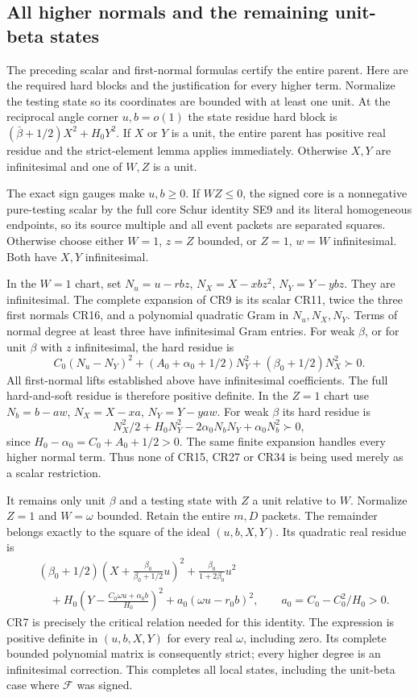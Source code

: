 \subsection{All higher normals and the remaining unit-beta states}

The preceding scalar and first-normal formulas certify the entire
parent. Here are the required hard blocks and the justification for
every higher term. Normalize the testing state so its coordinates
are bounded with at least one unit. At the reciprocal angle corner
$u,b=o(1)$ the state residue hard block is
$(\bar\beta+1/2)X^2+H_0Y^2$. If $X$ or $Y$ is a unit, the
entire parent has positive real residue and the strict-element lemma
applies immediately. Otherwise $X,Y$ are infinitesimal and one of
$W,Z$ is a unit.

The exact sign gauges make $u,b\geq0$. If $WZ\leq0$, the signed
core is a nonnegative pure-testing scalar by the full core Schur
identity SE9 and its literal homogeneous endpoints, so its source
multiple and all event packets are separated squares. Otherwise
choose either $W=1$, $z=Z$ bounded, or $Z=1$, $w=W$
infinitesimal. Both have $X,Y$ infinitesimal.

In the $W=1$ chart, set
$N_u=u-rbz$, $N_X=X-xbz^2$, $N_Y=Y-ybz$.
They are infinitesimal. The complete expansion of CR9 is its scalar
CR11, twice the three first normals CR16, and a polynomial quadratic
Gram in $N_u,N_X,N_Y$. Terms of normal degree at least three
have infinitesimal Gram entries. For weak $\beta$, or for unit
$\beta$ with $z$ infinitesimal, the hard residue is
\[
 C_0(N_u-N_Y)^2+(A_0+\alpha_0+1/2)N_Y^2
                         +(\beta_0+1/2)N_X^2\succ0.
 \tag{CR37}
\]
All first-normal lifts established above have infinitesimal
coefficients. The full hard-and-soft residue is therefore positive
definite. In the $Z=1$ chart use
$N_b=b-aw$, $N_X=X-xa$, $N_Y=Y-yaw$.
For weak $\beta$ its hard residue is
\[
 N_X^2/2+H_0N_Y^2-2\alpha_0N_bN_Y+\alpha_0N_b^2\succ0,
 \tag{CR38}
\]
since $H_0-\alpha_0=C_0+A_0+1/2>0$.
The same finite expansion handles every higher normal term. Thus
none of CR15, CR27 or CR34 is being used merely as a scalar
restriction.

It remains only unit $\beta$ and a testing state with $Z$ a unit
relative to $W$. Normalize $Z=1$ and $W=\omega$ bounded. Retain
the entire $m,D$ packets. The remainder belongs exactly to the
square of the ideal $(u,b,X,Y)$. Its quadratic real residue is
\[
\begin{aligned}
 &(\beta_0+1/2)\left(X+\frac{\beta_0}{\beta_0+1/2}u\right)^2
      +\frac{\beta_0}{1+2\beta_0}u^2\\
 &\quad+H_0\left(Y-\frac{C_0\omega u+\alpha_0 b}{H_0}\right)^2
      +a_0(\omega u-r_0b)^2,
 \qquad a_0=C_0-C_0^2/H_0>0.
\end{aligned}\tag{CR39}
\]
CR7 is precisely the critical relation needed for this identity.
The expression is positive definite in $(u,b,X,Y)$ for every
real $\omega$, including zero. Its complete bounded polynomial
matrix is consequently strict; every higher degree is an
infinitesimal correction. This completes all local states, including
the unit-beta case where $\mathcal F$ was signed.

